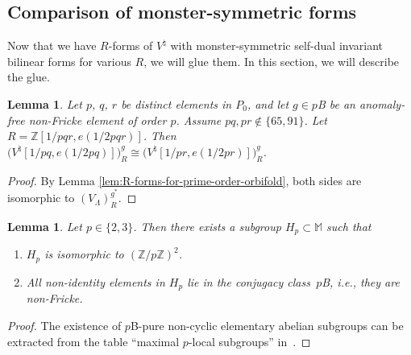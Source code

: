 \documentclass[pdftex]{sigma}
\newcommand{\bM}{\mathbb{M}}
\newcommand{\bZ}{\mathbb{Z}}
\newtheorem{lem}[thm]{Lemma}
\theoremstyle{definition}
\begin{document}
\subsection{Comparison of monster-symmetric forms}

Now that we have $R$-forms of $V^\natural$ with monster-symmetric self-dual invariant bilinear forms for various $R$, we will glue them. In this section, we will describe the glue.

\begin{lem} \label{lem:fixed-point-comparison}Let $p$, $q$, $r$ be distinct elements in $P_0$, and let $g \in p$B be an anomaly-free non-Fricke element of order $p$. Assume $pq, pr \not\in \{65, 91\}$. Let $R = \bZ[1/pqr, e(1/2pqr)]$. Then $\big(V^\natural[1/pq,e(1/2pq)]\big)^g_R \cong \big(V^\natural[1/pr,e(1/2pr)]\big)^g_R$.
\end{lem}
\begin{proof}By Lemma \ref{lem:R-forms-for-prime-order-orbifold}, both sides are isomorphic to $(V_\Lambda)_R^{g^*}$.
\end{proof}

\begin{lem} \label{lem:affine-subgroups-of-monster}Let $p \in \{2,3\}$. Then there exists a subgroup $H_p \subset \bM$ such that
\begin{enumerate}\itemsep=0pt
\item[$1.$] $H_p$ is isomorphic to $(\bZ/p\bZ)^2$.
\item[$2.$] All non-identity elements in $H_p$ lie in the conjugacy class~$p$B, i.e., they are non-Fricke.
\end{enumerate}
\end{lem}
\begin{proof}The existence of $p$B-pure non-cyclic elementary abelian subgroups can be extracted from the table ``maximal $p$-local subgroups'' in~\cite{ATLAS}.
\end{proof}
\end{document}

